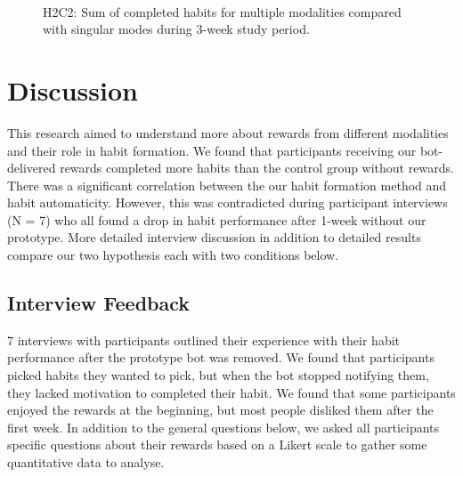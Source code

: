 \documentclass{scaffold/sigchi}
\begin{document}
\begin{figure}
  \centering
  \caption{H2C2: Sum of completed habits for multiple modalities compared with singular modes during 3-week study period.}~\label{fig:c2_h2}
\end{figure}


\section{Discussion}
This research aimed to understand more about rewards from different modalities and their role in habit formation. We found that participants receiving our bot-delivered rewards completed more habits than the control group without rewards. There was a significant correlation between the our habit formation method and habit automaticity. However, this was contradicted during participant interviews (N = 7) who all found a drop in habit performance after 1-week without our prototype. More detailed interview discussion in addition to detailed results compare our two hypothesis each with two conditions below.

\subsection{Interview Feedback}
7 interviews with participants outlined their experience with their habit performance after the prototype bot was removed. We found that participants picked habits they wanted to pick, but when the bot stopped notifying them, they lacked motivation to completed their habit. We found that some participants enjoyed the rewards at the beginning, but most people disliked them after the first week. In addition to the general questions below, we asked all participants specific questions about their rewards based on a Likert scale to gather some quantitative data to analyse.
\end{document}
